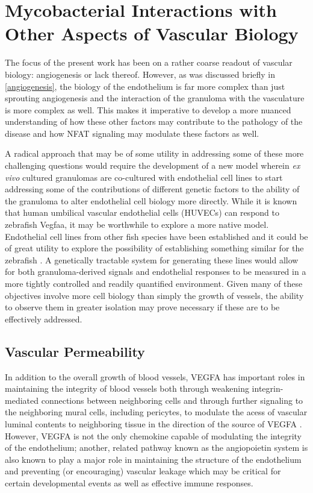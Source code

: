 \section{Mycobacterial Interactions with Other Aspects of Vascular Biology}\label{othervasc}

The focus of the present work has been on a rather coarse readout of vascular biology: angiogenesis or lack thereof. However, as was discussed briefly in \autoref{angiogenesis}, the biology of the endothelium is far more complex than just sprouting angiogenesis and the interaction of the granuloma with the vasculature is more complex as well. This makes it imperative to develop a more nuanced understanding of how these other factors may contribute to the pathology of the disease and how NFAT signaling may modulate these factors as well. 

A radical approach that may be of some utility in addressing some of these more challenging questions would require the development of a new model wherein \textit{ex vivo} cultured granulomas are co\hyp{}cultured with endothelial cell lines to start addressing some of the contributions of different genetic factors to the ability of the granuloma to alter endothelial cell biology more directly. While it is known that human umbilical vascular endothelial cells (HUVECs) can respond to zebrafish Vegfaa, it may be worthwhile to explore a more native model. Endothelial cell lines from other fish species have been established and it could be of great utility to explore the possibility of establishing something similar for the zebrafish \citep{Luque2014, Pham2017}. A genetically tractable system for generating these lines would allow for both granuloma\hyp{}derived signals and endothelial responses to be measured in a more tightly controlled and readily quantified environment. Given many of these objectives involve more cell biology than simply the growth of vessels, the ability to observe them in greater isolation may prove necessary if these are to be effectively addressed.

\subsection{Vascular Permeability}\label{permeability}

In addition to the overall growth of blood vessels, VEGFA has important roles in maintaining the integrity of blood vessels both through weakening integrin\hyp{}mediated connections between neighboring cells and through further signaling to the neighboring mural cells, including pericytes, to modulate the acess of vascular luminal contents to neighboring tissue in the direction of the source of VEGFA \citep{ClaessonWelsh2015, ParkWindhol2016}. However, VEGFA is not the only chemokine capable of modulating the integrity of the endothelium; another, related pathway known as the angiopoietin system is also known to play a major role in maintaining the structure of the endothelium and preventing (or encouraging) vascular leakage which may be critical for certain developmental events as well as effective immune responses.

